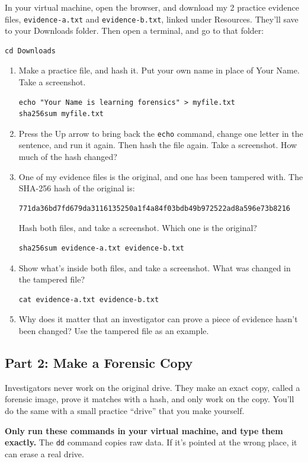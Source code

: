 \documentclass[12pt]{article}
\begin{document}
In your virtual machine, open the browser, and download my 2 practice evidence files, \texttt{evidence-a.txt} and \texttt{evidence-b.txt}, linked under Resources. They'll save to your Downloads folder. Then open a terminal, and go to that folder:
\begin{Verbatim}
cd Downloads
\end{Verbatim}
\begin{enumerate}
    \item Make a practice file, and hash it. Put your own name in place of Your Name. Take a screenshot.
\begin{Verbatim}
echo "Your Name is learning forensics" > myfile.txt
sha256sum myfile.txt
\end{Verbatim}
    \item Press the Up arrow to bring back the \texttt{echo} command, change one letter in the sentence, and run it again. Then hash the file again. Take a screenshot. How much of the hash changed?
    \item One of my evidence files is the original, and one has been tampered with. The SHA-256 hash of the original is:
\begin{Verbatim}
771da36bd7fd679da3116135250a1f4a84f03bdb49b972522ad8a596e73b8216
\end{Verbatim}
    Hash both files, and take a screenshot. Which one is the original?
\begin{Verbatim}
sha256sum evidence-a.txt evidence-b.txt
\end{Verbatim}
    \item Show what's inside both files, and take a screenshot. What was changed in the tampered file?
\begin{Verbatim}
cat evidence-a.txt evidence-b.txt
\end{Verbatim}
    \item Why does it matter that an investigator can prove a piece of evidence hasn't been changed? Use the tampered file as an example.
\end{enumerate}

\subsection*{Part 2: Make a Forensic Copy}
Investigators never work on the original drive. They make an exact copy, called a forensic image, prove it matches with a hash, and only work on the copy. You'll do the same with a small practice ``drive'' that you make yourself.

\textbf{Only run these commands in your virtual machine, and type them exactly.} The \texttt{dd} command copies raw data. If it's pointed at the wrong place, it can erase a real drive.
\end{document}
